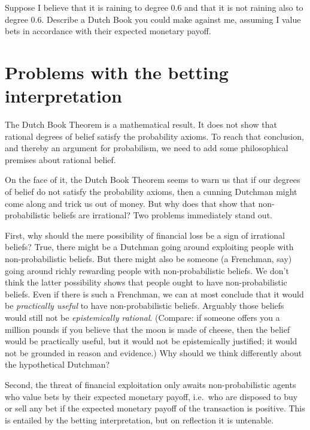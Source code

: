 
\begin{exercise}
  Suppose I believe that it is raining to degree 0.6 and that it is
  not raining also to degree 0.6. Describe a Dutch Book you could make
  against me, assuming I value bets in accordance with their expected
  monetary payoff.
\end{exercise}

\section{Problems with the betting interpretation}\label{sec:problem-betting}

The Dutch Book Theorem is a mathematical result. It does not show that
rational degrees of belief satisfy the probability axioms. To reach
that conclusion, and thereby an argument for probabilism, we need to
add some philosophical premises about rational belief.

On the face of it, the Dutch Book Theorem seems to warn us that if our
degrees of belief do not satisfy the probability axioms, then a
cunning Dutchman might come along and trick us out of money. But why
does that show that non-probabilistic beliefs are irrational?  Two
problems immediately stand out.

First, why should the mere possibility of financial loss be a sign of
irrational beliefs? True, there might be a Dutchman going around
exploiting people with non-probabilistic beliefs. But there might also
be someone (a Frenchman, say) going around richly rewarding people
with non-probabilistic beliefs. We don't think the latter possibility
shows that people ought to have non-probabilistic beliefs. Even if
there is such a Frenchman, we can at most conclude that it would be
\emph{practically useful} to have non-probabilistic beliefs. Arguably
those beliefs would still not be \emph{epistemically
  rational}. (Compare: if someone offers you a million pounds if you
believe that the moon is made of cheese, then the belief would be
practically useful, but it would not be epistemically justified;
it would not be grounded in reason and evidence.) Why should we think
differently about the hypothetical Dutchman? 

Second, the threat of financial exploitation only awaits
non-probabilistic agents who value bets by their expected monetary
payoff, i.e.\ who are disposed to buy or sell any bet if the expected
monetary payoff of the transaction is positive. This is entailed by
the betting interpretation, but on reflection it is untenable.

